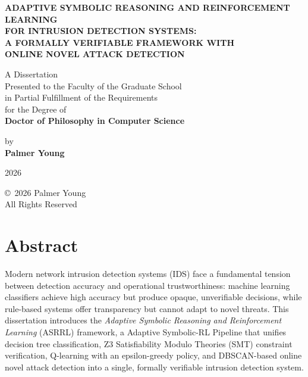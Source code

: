 \documentclass[12pt, letterpaper, oneside]{report}
\newcommand{\ASRRL}{\textsc{ASRRL}}
\begin{document}
\begin{titlepage}
\centering
\vspace*{1in}

{\Large\bfseries ADAPTIVE SYMBOLIC REASONING AND REINFORCEMENT LEARNING\\
FOR INTRUSION DETECTION SYSTEMS:\\
A FORMALLY VERIFIABLE FRAMEWORK WITH\\
ONLINE NOVEL ATTACK DETECTION}

\vspace{1.5in}

{\large A Dissertation\\
Presented to the Faculty of the Graduate School\\
in Partial Fulfillment of the Requirements\\
for the Degree of\\[0.5em]
\textbf{Doctor of Philosophy in Computer Science}}

\vspace{1.5in}

{\large by\\[0.5em]
\textbf{Palmer Young}}

\vspace{1.5in}

{\large 2026}

\end{titlepage}

\thispagestyle{empty}
\vspace*{\fill}
\begin{center}
\copyright\ 2026 Palmer Young\\
All Rights Reserved
\end{center}
\vspace*{\fill}
\clearpage

\setcounter{page}{3}

\chapter*{Abstract}

Modern network intrusion detection systems (IDS) face a fundamental tension between detection accuracy and operational trustworthiness: machine learning classifiers achieve high accuracy but produce opaque, unverifiable decisions, while rule-based systems offer transparency but cannot adapt to novel threats. This dissertation introduces the \emph{Adaptive Symbolic Reasoning and Reinforcement Learning} (\ASRRL{}) framework, a Adaptive Symbolic-RL Pipeline that unifies decision tree classification, Z3 Satisfiability Modulo Theories (SMT) constraint verification, Q-learning with an epsilon-greedy policy, and DBSCAN-based online novel attack detection into a single, formally verifiable intrusion detection system.
\end{document}
